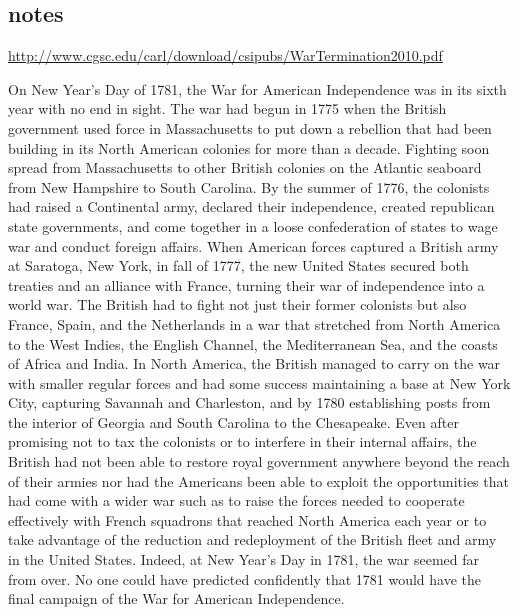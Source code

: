 \subsection{notes}

\url{http://www.cgsc.edu/carl/download/csipubs/WarTermination2010.pdf}


On New Year's Day of 1781, the War for American Independence was in its sixth
year with no end in sight. The war had begun in 1775 when the British
government used force in Massachusetts to put down a rebellion that had been
building in its North American colonies for more than a decade. Fighting soon
spread from Massachusetts to other British colonies on the Atlantic seaboard
from New Hampshire to South Carolina. By the summer of 1776, the colonists had
raised a Continental army, declared their independence, created republican
state governments, and come together in a loose confederation of states to wage
war and conduct foreign affairs. When American forces captured a British army
at Saratoga, New York, in fall of 1777, the new United States secured both
treaties and an alliance with France, turning their war of independence into a
world war. The British had to fight not just their former colonists but also
France, Spain, and the Netherlands in a war that stretched from North America
to the West Indies, the English Channel, the Mediterranean Sea, and the coasts
of Africa and India. In North America, the British managed to carry on the war
with smaller regular forces and had some success maintaining a base at New York
City, capturing Savannah and Charleston, and by 1780 establishing posts from
the interior of Georgia and South Carolina to the Chesapeake. Even after
promising not to tax the colonists or to interfere in their internal affairs,
the British had not been able to restore royal government anywhere beyond the
reach of their armies nor had the Americans been able to exploit the
opportunities that had come with a wider war such as to raise the forces needed
to cooperate effectively with French squadrons that reached North America each
year or to take advantage of the reduction and redeployment of the British
fleet and army in the United States. Indeed, at New Year's Day in 1781, the war
seemed far from over. No one could have predicted confidently that 1781 would
have the final campaign of the War for American Independence.

